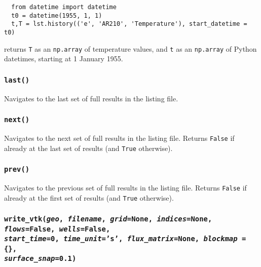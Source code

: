 \begin{lstlisting}
  from datetime import datetime
  t0 = datetime(1955, 1, 1)
  t,T = lst.history(('e', 'AR210', 'Temperature'), start_datetime = t0)
\end{lstlisting}

returns \texttt{T} as an \texttt{np.array} of temperature values, and \texttt{t} as an \texttt{np.array} of Python datetimes, starting at 1 January 1955.

\begin{snugshade}
\subsubsection{\texttt{last()}}
\end{snugshade}
\label{sec:t2listing:last}

Navigates to the last set of full results in the listing file.

\begin{snugshade}
\subsubsection{\texttt{next()}}
\end{snugshade}
\label{sec:t2listing:next}

Navigates to the next set of full results in the listing file.  Returns \texttt{False} if already at the last set of results (and \texttt{True} otherwise).

\begin{snugshade}
\subsubsection{\texttt{prev()}}
\end{snugshade}
\label{sec:t2listing:prev}

Navigates to the previous set of full results in the listing file.  Returns \texttt{False} if already at the first set of results (and \texttt{True} otherwise).

\begin{snugshade}
\subsubsection{\texttt{write\_vtk(\emph{geo}, \emph{filename}, \emph{grid}=None, \emph{indices}=None, \emph{flows}=False,
\emph{wells}=False,\\
\emph{start\_time}=0, \emph{time\_unit}='s', \emph{flux\_matrix}=None, \emph{blockmap} = \{\},\\
 \emph{surface\_snap}=0.1)}}
\end{snugshade}
\label{sec:t2listing:write_vtk}

